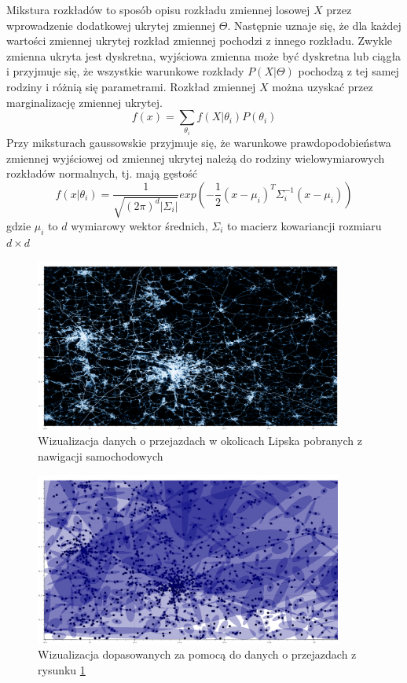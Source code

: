 Mikstura rozkładów to sposób opisu rozkładu zmiennej losowej $X$ przez wprowadzenie dodatkowej ukrytej zmiennej $\Theta$.
Następnie uznaje się, że dla każdej wartości zmiennej ukrytej rozkład zmiennej pochodzi z innego rozkładu.
Zwykle zmienna ukryta jest dyskretna, wyjściowa zmienna może być dyskretna lub ciągła i przyjmuje się, że wszystkie
warunkowe rozkłady $P(X|\Theta)$ pochodzą z tej samej rodziny i różnią się parametrami. Rozkład zmiennej $X$ można
uzyskać przez marginalizację zmiennej ukrytej.
$$f(x) = \sum_{\theta_i} f(X | \theta_i) P(\theta_i)$$
Przy miksturach gaussowskie przyjmuje się, że warunkowe prawdopodobieństwa zmiennej wyjściowej od zmiennej ukrytej
należą do rodziny wielowymiarowych rozkładów normalnych, tj. mają gęstość
$$f(x | \theta_i) = \frac{1}{\sqrt{(2 \pi)^d |\Sigma_i|}} exp(-\frac{1}{2} (x - \mu_i)^T \Sigma_i^{-1} (x - \mu_i))$$
gdzie $\mu_i$ to $d$ wymiarowy wektor średnich, $\Sigma_i$ to macierz kowariancji rozmiaru $d \times d$

\begin{figure}[H]
    \centering
    \includegraphics[width=0.9\textwidth]{images/2_2_a_leipzig_datashader}
    \caption{Wizualizacja  danych o przejazdach w okolicach Lipska pobranych z nawigacji samochodowych}
    \label{fig:2_2_a_leipzig_datashader}
\end{figure}

\begin{figure}[H]
    \centering
    \includegraphics[width=0.9\textwidth]{images/2_2_a_leipzig_gmm}
    \caption{Wizualizacja  dopasowanych za pomocą  do danych o przejazdach z rysunku \ref{fig:2_2_a_leipzig_datashader}}
    \label{fig:2_2_a_leipzig_gmm}
\end{figure}

